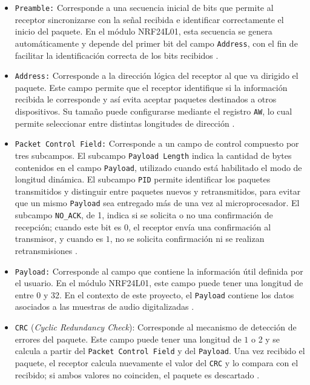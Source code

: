 \begin{itemize}
    \item \texttt{Preamble:} Corresponde a una secuencia inicial de bits que permite al receptor sincronizarse con la señal recibida e identificar correctamente el inicio del paquete.
    En el módulo NRF24L01, esta secuencia se genera automáticamente y depende del primer bit del campo \texttt{Address}, con el fin de facilitar la identificación correcta de los bits recibidos \cite{nordic}.

    \item \texttt{Address:} Corresponde a la dirección lógica del receptor al que va dirigido el paquete.
    Este campo permite que el receptor identifique si la información recibida le corresponde y así evita aceptar paquetes destinados a otros dispositivos.
    Su tamaño puede configurarse mediante el registro \texttt{AW}, lo cual permite seleccionar entre distintas longitudes de dirección \cite{nordic}.

    \item \texttt{Packet Control Field:} Corresponde a un campo de control compuesto por tres subcampos.
    El subcampo \texttt{Payload Length} indica la cantidad de bytes contenidos en el campo \texttt{Payload}, utilizado cuando está habilitado el modo de longitud dinámica.
    El subcampo \texttt{PID} permite identificar los paquetes transmitidos y distinguir entre paquetes nuevos y retransmitidos, para evitar que un mismo \texttt{Payload} sea entregado más de una vez al microprocesador.
    El subcampo \texttt{NO\_ACK}, de \SI{1}{\bit}, indica si se solicita o no una confirmación de recepción; cuando este bit es $0$, el receptor envía una confirmación al transmisor, y cuando es $1$, no se solicita confirmación ni se realizan retransmisiones \cite{nordic}.

    \item \texttt{Payload:} Corresponde al campo que contiene la información útil definida por el usuario.
    En el módulo NRF24L01, este campo puede tener una longitud de entre $0$ y \SI{32}{\byte}.
    En el contexto de este proyecto, el \texttt{Payload} contiene los datos asociados a las muestras de audio digitalizadas \cite{nordic}.

    \item \texttt{CRC} (\textit{Cyclic Redundancy Check}): Corresponde al mecanismo de detección de errores del paquete.
    Este campo puede tener una longitud de $1$ o \SI{2}{\byte} y se calcula a partir del \texttt{Packet Control Field} y del \texttt{Payload}.
    Una vez recibido el paquete, el receptor calcula nuevamente el valor del \texttt{CRC} y lo compara con el recibido; si ambos valores no coinciden, el paquete es descartado \cite{nordic}.
\end{itemize}


